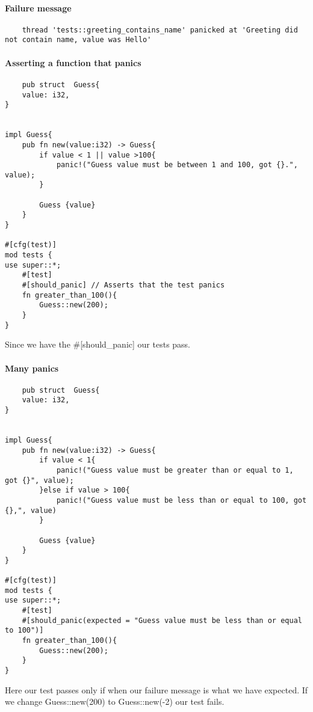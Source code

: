 \paragraph*{Failure message}\begin{lstlisting}
    thread 'tests::greeting_contains_name' panicked at 'Greeting did not contain name, value was Hello'
\end{lstlisting}

\paragraph*{Asserting a function that panics}\begin{lstlisting}
    pub struct  Guess{
    value: i32,
}


impl Guess{
    pub fn new(value:i32) -> Guess{
        if value < 1 || value >100{
            panic!("Guess value must be between 1 and 100, got {}.", value);  
        }

        Guess {value}
    }
}

#[cfg(test)]
mod tests {
use super::*; 
    #[test]
    #[should_panic] // Asserts that the test panics
    fn greater_than_100(){
        Guess::new(200);
    }
}
\end{lstlisting}

Since we have the \#[should\_panic] our tests pass.

\paragraph*{Many panics}\begin{lstlisting}
    pub struct  Guess{
    value: i32,
}


impl Guess{
    pub fn new(value:i32) -> Guess{
        if value < 1{
            panic!("Guess value must be greater than or equal to 1, got {}", value);
        }else if value > 100{
            panic!("Guess value must be less than or equal to 100, got {},", value)
        }

        Guess {value}
    }
}

#[cfg(test)]
mod tests {
use super::*; 
    #[test]
    #[should_panic(expected = "Guess value must be less than or equal to 100")]
    fn greater_than_100(){
        Guess::new(200);
    }
}
\end{lstlisting}

Here our test passes only if when our failure message is what we have expected. If we change Guess::new{(200)} to Guess::new{(-2)} our test fails.



